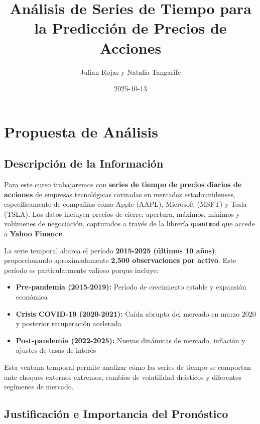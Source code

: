 \documentclass[
]{book}
\title{Análisis de Series de Tiempo para la Predicción de Precios de Acciones}
\author{Julian Rojas y Natalia Tangarife}
\date{2025-10-13}
\providecommand{\tightlist}{%
  \setlength{\itemsep}{0pt}\setlength{\parskip}{0pt}}
\begin{document}
\maketitle

{
\setcounter{tocdepth}{1}
\tableofcontents
}
\chapter*{Propuesta de Análisis}\label{propuesta-de-anuxe1lisis}

\section{Descripción de la Información}\label{descripciuxf3n-de-la-informaciuxf3n}

Para este curso trabajaremos con \textbf{series de tiempo de precios diarios de acciones} de empresas tecnológicas cotizadas en mercados estadounidenses, específicamente de compañías como Apple (AAPL), Microsoft (MSFT) y Tesla (TSLA). Los datos incluyen precios de cierre, apertura, máximos, mínimos y volúmenes de negociación, capturados a través de la librería \texttt{quantmod} que accede a \textbf{Yahoo Finance}.

La serie temporal abarca el período \textbf{2015-2025 (últimos 10 años)}, proporcionando aproximadamente \textbf{2,500 observaciones por activo}. Este período es particularmente valioso porque incluye:

\begin{itemize}
\tightlist
\item
  \textbf{Pre-pandemia (2015-2019):} Período de crecimiento estable y expansión económica
\item
  \textbf{Crisis COVID-19 (2020-2021):} Caída abrupta del mercado en marzo 2020 y posterior recuperación acelerada
\item
  \textbf{Post-pandemia (2022-2025):} Nuevas dinámicas de mercado, inflación y ajustes de tasas de interés
\end{itemize}

Esta ventana temporal permite analizar cómo las series de tiempo se comportan ante choques externos extremos, cambios de volatilidad drásticos y diferentes regímenes de mercado.

\section{Justificación e Importancia del Pronóstico}\label{justificaciuxf3n-e-importancia-del-pronuxf3stico}
\end{document}
